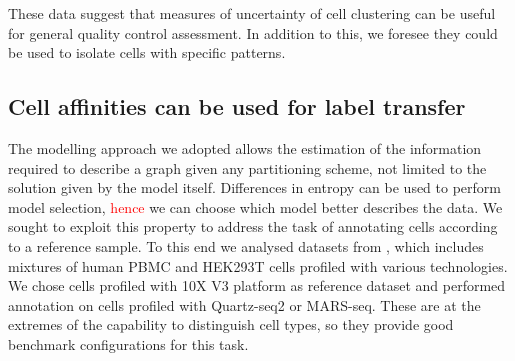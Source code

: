 \documentclass[10pt]{article}
\begin{document}
These data suggest that measures of uncertainty of cell clustering can be useful for general quality control assessment. In addition to this, we foresee they could be used to isolate cells with specific patterns.



\subsection*{Cell affinities can be used for label transfer}

The modelling approach we adopted allows the estimation of the information required to describe a graph given any partitioning scheme, not limited to the solution given by the model itself. Differences in entropy can be used to perform model selection, \textcolor{red}{hence} we can choose which model better describes the data. We sought to exploit this property to address the task of annotating cells according to a reference sample. To this end we analysed datasets from \cite{mereu_2020}, which includes mixtures of human PBMC and HEK293T cells profiled with various technologies. We chose cells profiled with 10X V3 platform as reference dataset and performed annotation on cells profiled with Quartz-seq2 or MARS-seq. These are at the extremes of the capability to distinguish cell types, so they provide good benchmark configurations for this task. 
\end{document}
